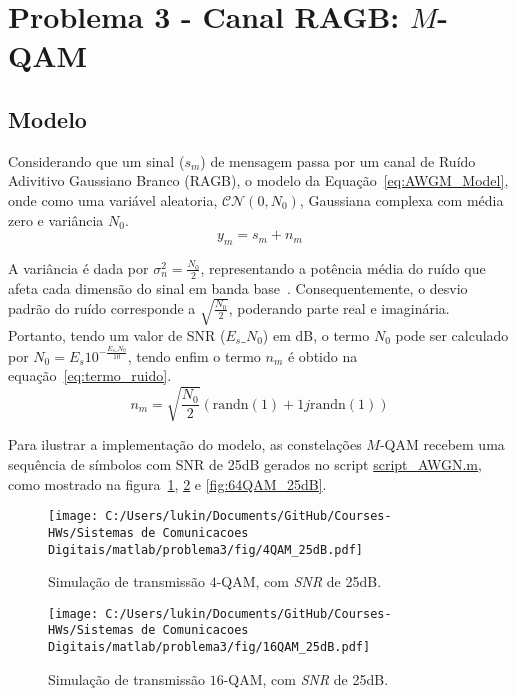 \section{Problema 3 - Canal RAGB: \texorpdfstring{$M$}{M}-QAM}
\subsection{Modelo}
Considerando que um sinal ($s_m$) de mensagem passa por um canal de Ruído Adivitivo Gaussiano Branco (RAGB), o modelo da Equação~\ref{eq:AWGM_Model}, onde como uma variável aleatoria, $\mathcal{C} \mathcal{N} (0,N_0)$, Gaussiana complexa com média zero e variância $N_0$. 
\begin{equation}
    y_m = s_m + n_m
    \label{eq:AWGM_Model}
\end{equation}

A variância é dada por $\sigma_{n}^{2} = \frac{N_0}{2}$, representando a potência média do ruído que afeta cada dimensão do sinal em banda base~\cite{Proakis}. Consequentemente, o desvio padrão do ruído corresponde a $\sqrt{\frac{N_0}{2}}$, poderando parte real e imaginária. Portanto, tendo um valor de SNR ($E_s\_N_0$) em dB, o termo $N_0$ pode ser calculado por $N_0= E_s 10^{-\frac{E_s\_N_0}{10}}$, tendo enfim o termo $n_m$ é obtido na equação~\ref{eq:termo_ruido}.
\begin{equation}
    n_m = \sqrt{\frac{N_0}{2}} \left(\text{randn}(1) + 1j \text{randn}(1)\right)
    \label{eq:termo_ruido}
\end{equation}

Para ilustrar a implementação do modelo, as constelações $M$-QAM recebem uma sequência de símbolos com SNR de 25dB gerados no script \href{https://raw.githubusercontent.com/lucasabdalah/Courses-HWs/SCD/Sistemas%20de%20Comunicacoes%20Digitais/matlab/problema3/script_AWGN.m}{\colorbox{cyan!10}{script\_AWGN.m}}, como mostrado na figura~\ref{fig:4QAM_25dB}, \ref{fig:16QAM_25dB} e \ref{fig:64QAM_25dB}.

\begin{figure}[!ht]
    \centering
    \texttt{[image: C:/Users/lukin/Documents/GitHub/Courses-HWs/Sistemas de Comunicacoes Digitais/matlab/problema3/fig/4QAM\_25dB.pdf]}
    \caption{Simulação de transmissão $4$-QAM, com \textit{SNR} de 25dB.}
    \label{fig:4QAM_25dB}
\end{figure}

\begin{figure}[!ht]
    \centering
    \texttt{[image: C:/Users/lukin/Documents/GitHub/Courses-HWs/Sistemas de Comunicacoes Digitais/matlab/problema3/fig/16QAM\_25dB.pdf]}
    \caption{Simulação de transmissão $16$-QAM, com \textit{SNR} de 25dB.}
    \label{fig:16QAM_25dB}
\end{figure}

